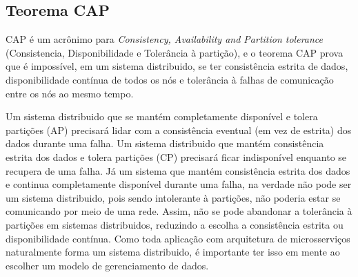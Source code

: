 \subsection{Teorema CAP}\label{teorema-cap}
CAP é um acrônimo para \emph{Consistency, Availability and Partition tolerance} (Consistencia, Disponibilidade e Tolerância à partição), e o teorema CAP prova que é impossível, em um sistema distribuido, se ter consistência estrita de dados, disponibilidade contínua de todos os nós e tolerância à falhas de comunicação entre os nós ao mesmo tempo.

Um sistema distribuido que se mantém completamente disponível e tolera partições (AP) precisará lidar com a consistência eventual (em vez de estrita) dos dados durante uma falha. Um sistema distribuido que mantém consistência estrita dos dados e tolera partições (CP) precisará ficar indisponível enquanto se recupera de uma falha. Já um sistema que mantém consistência estrita dos dados e continua completamente disponível durante uma falha, na verdade não pode ser um sistema distribuido, pois sendo intolerante à partições, não poderia estar se comunicando por meio de uma rede. Assim, não se pode abandonar a tolerância à partições em sistemas distribuidos, reduzindo a escolha a consistência estrita ou disponibilidade contínua. Como toda aplicação com arquitetura de microsserviços naturalmente forma um sistema distribuido, é importante ter isso em mente ao escolher um modelo de gerenciamento de dados. \cite{teorema-cap-ibm,livro-building-microservices}




